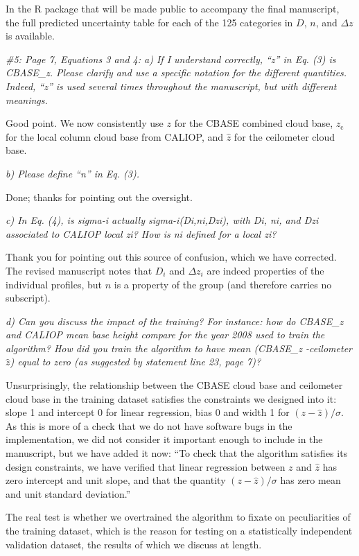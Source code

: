 \documentclass[12pt,a4paper]{responses}
\begin{document}
In the R package that will be made public to accompany the final manuscript, the
full predicted uncertainty table for each of the 125 categories in $D$, $n$, and
$\Delta z$ is available.

\textit{\#5: Page 7, Equations 3 and 4: a) If I understand correctly, “z” in Eq. (3) is CBASE\_z.
Please clarify and use a specific notation for the different quantities. Indeed, “z” is used
several times throughout the manuscript, but with different meanings.}

Good point.  We now consistently use $z$ for the CBASE combined cloud base,
$z_\text{c}$ for the local column cloud base from CALIOP, and $\hat{z}$ for the
ceilometer cloud base.

\textit{b) Please define “n” in Eq.  (3).}

Done; thanks for pointing out the oversight.

\textit{c) In Eq.  (4), is sigma-i actually sigma-i(Di,ni,Dzi), with Di, ni, and Dzi
associated to CALIOP local zi? How is ni defined for a local zi?}

Thank you for pointing out this source of confusion, which we have corrected.
The revised manuscript notes that $D_i$ and $\Delta z_i$ are indeed properties
of the individual profiles, but $n$ is a property of the group (and therefore
carries no subscript).

\textit{d) Can you discuss the impact of the training? For instance: how do
  CBASE\_z and CALIOP mean base height compare for the year 2008 used to train
  the algorithm? How did you train the algorithm to have mean (CBASE\_z
  -ceilometer $\hat{z}$) equal to zero (as suggested by statement line 23, page
  7)?}

Unsurprisingly, the relationship between the CBASE cloud base and ceilometer
cloud base in the training dataset satisfies the constraints we designed into
it: slope 1 and intercept 0 for linear regression, bias 0 and width 1 for
$(z - \hat{z})/\sigma$.  As this is more of a check that we do not have software
bugs in the implementation, we did not consider it important enough to include
in the manuscript, but we have added it now: ``To check that the algorithm
satisfies its design constraints, we have verified that linear regression
between $z$ and $\hat{z}$ has zero intercept and unit slope, and that the
quantity $(z - \hat{z})/\sigma$ has zero mean and unit standard deviation.''


The real test is whether we overtrained the algorithm to fixate on peculiarities
of the training dataset, which is the reason for testing on a statistically
independent validation dataset, the results of which we discuss at length.
\end{document}
